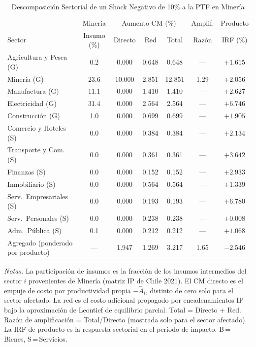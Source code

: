 \begin{table}[htbp]
\centering
\caption{Descomposición Sectorial de un Shock Negativo de 10\% a la PTF en Minería}
\label{tab:min_decomp}
\begin{threeparttable}
\small
\begin{tabular}{@{}l c c c c c c@{}}
\toprule
 & Minería & \multicolumn{3}{c}{Aumento CM (\%)} & Amplif. & Producto \\
\cmidrule(lr){3-5}
Sector & Insumo (\%) & Directo & Red & Total & Razón & IRF (\%) \\
\midrule
Agricultura y Pesca (G) &  0.2 & 0.000 & 0.648 & 0.648 & --- & $+1.615$ \\
Minería (G) & 23.6 & 10.000 & 2.851 & 12.851 &  1.29 & $+2.056$ \\
Manufactura (G) & 11.1 & 0.000 & 1.410 & 1.410 & --- & $+2.627$ \\
Electricidad (G) & 31.4 & 0.000 & 2.564 & 2.564 & --- & $+6.746$ \\
Construcción (G) &  1.0 & 0.000 & 0.699 & 0.699 & --- & $+1.905$ \\
Comercio y Hoteles (S) &  0.0 & 0.000 & 0.384 & 0.384 & --- & $+2.134$ \\
Transporte y Com. (S) &  0.0 & 0.000 & 0.361 & 0.361 & --- & $+3.642$ \\
Finanzas (S) &  0.0 & 0.000 & 0.152 & 0.152 & --- & $+2.933$ \\
Inmobiliario (S) &  0.0 & 0.000 & 0.564 & 0.564 & --- & $+1.339$ \\
Serv.\ Empresariales (S) &  0.0 & 0.000 & 0.193 & 0.193 & --- & $+6.780$ \\
Serv.\ Personales (S) &  0.0 & 0.000 & 0.238 & 0.238 & --- & $+0.008$ \\
Adm.\ Pública (S) &  0.1 & 0.000 & 0.212 & 0.212 & --- & $+1.068$ \\
\midrule
Agregado (ponderado por producto) & --- & 1.947 & 1.269 & 3.217 &  1.65 & $-2.546$ \\
\bottomrule
\end{tabular}
\begin{tablenotes}[flushleft]
\footnotesize
\item \textit{Notas:} La participación de insumos es la fracción de los insumos intermedios del sector $i$ provenientes de Minería (matriz IP de Chile 2021). El CM directo es el empuje de costo por productividad propia $-\hat A_i$, distinto de cero solo para el sector afectado. La red es el costo adicional propagado por encadenamientos IP bajo la aproximación de Leontief de equilibrio parcial. Total = Directo + Red. Razón de amplificación = Total/Directo (mostrada solo para el sector afectado). La IRF de producto es la respuesta sectorial en el período de impacto. B\,=\,Bienes, S\,=\,Servicios.
\end{tablenotes}
\end{threeparttable}
\end{table}
